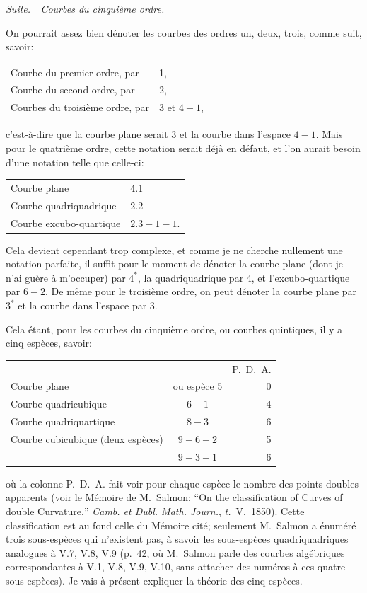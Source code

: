 \documentclass[11pt,a4paper]{article}
\newcommand{\tome}{\textit{t.}}
\begin{document}
\medskip
\noindent\textit{Suite.\ \ Courbes du cinqui\`{e}me ordre.}
\medskip

On pourrait assez bien d\'{e}noter les courbes des ordres un, deux, trois, comme suit, savoir:
\begin{center}
\begin{tabular}{ll}
Courbe du premier ordre, par & 1, \\
Courbe du second ordre, par & 2, \\
Courbes du troisi\`{e}me ordre, par & 3 et $4 - 1$,
\end{tabular}
\end{center}

\clearpage

c'est-\`{a}-dire que la courbe plane serait 3 et la courbe dans l'espace $4 - 1$. Mais pour le quatri\`{e}me ordre, cette notation serait d\'{e}j\`{a} en d\'{e}faut, et l'on aurait besoin d'une notation telle que celle-ci:
\begin{center}
\begin{tabular}{ll}
Courbe plane & 4.1 \\
Courbe quadriquadrique & 2.2 \\
Courbe excubo-quartique & $2.3 - 1 - 1$.
\end{tabular}
\end{center}

Cela devient cependant trop complexe, et comme je ne cherche nullement une notation parfaite, il suffit pour le moment de d\'{e}noter la courbe plane (dont je n'ai gu\`{e}re \`{a} m'occuper) par $4^*$, la quadriquadrique par 4, et l'excubo-quartique par $6 - 2$. De m\^{e}me pour le troisi\`{e}me ordre, on peut d\'{e}noter la courbe plane par $3^*$ et la courbe dans l'espace par 3.

Cela \'{e}tant, pour les courbes du cinqui\`{e}me ordre, ou courbes quintiques, il y a cinq esp\`{e}ces, savoir:
\begin{center}
\begin{tabular}{lcr}
 & & P.~D.~A. \\
Courbe plane & ou esp\`{e}ce 5 & 0 \\
Courbe quadricubique & $6 - 1$ & 4 \\
Courbe quadriquartique & $8 - 3$ & 6 \\
Courbe cubicubique (deux esp\`{e}ces) & $9 - 6 + 2$ & 5 \\
 & $9 - 3 - 1$ & 6 \\
\end{tabular}
\end{center}
o\`{u} la colonne P.~D.~A. fait voir pour chaque esp\`{e}ce le nombre des points doubles apparents (voir le M\'{e}moire de M.~Salmon: ``On the classification of Curves of double Curvature,'' \textit{Camb. et Dubl. Math. Journ.}, \tome~V.\ 1850). Cette classification est au fond celle du M\'{e}moire cit\'{e}; seulement M.~Salmon a \'{e}num\'{e}r\'{e} trois sous-esp\`{e}ces qui n'existent pas, \`{a} savoir les sous-esp\`{e}ces quadriquadriques analogues \`{a} V.7, V.8, V.9 (p.~42, o\`{u} M.~Salmon parle des courbes alg\'{e}briques correspondantes \`{a} V.1, V.8, V.9, V.10, sans attacher des num\'{e}ros \`{a} ces quatre sous-esp\`{e}ces). Je vais \`{a} pr\'{e}sent expliquer la th\'{e}orie des cinq esp\`{e}ces.
\end{document}
